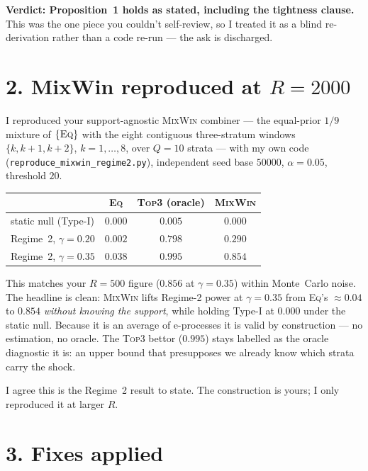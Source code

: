 \documentclass[11pt,a4paper]{article}
\begin{document}
\noindent \textbf{Verdict: Proposition~1 holds as stated, including the tightness
clause.} This was the one piece you couldn't self-review, so I treated it as a blind
re-derivation rather than a code re-run --- the ask is discharged.

\section*{2. MixWin reproduced at $R = 2000$}

I reproduced your support-agnostic \textsc{MixWin} combiner --- the equal-prior
$1/9$ mixture of $\{\textsc{Eq}\}$ with the eight contiguous three-stratum windows
$\{k, k{+}1, k{+}2\}$, $k = 1,\dots,8$, over $Q = 10$ strata --- with my own code
(\texttt{reproduce\_mixwin\_regime2.py}), independent seed base $50000$,
$\alpha = 0.05$, threshold $20$.

\medskip
\begin{center}
\begin{tabular}{lccc}
\toprule
 & \textsc{Eq} & \textsc{Top3} (oracle) & \textsc{MixWin} \\
\midrule
static null (Type-I)    & $0.000$ & $0.005$ & $0.000$ \\
Regime~2, $\gamma = 0.20$ & $0.002$ & $0.798$ & $0.290$ \\
Regime~2, $\gamma = 0.35$ & $0.038$ & $0.995$ & $0.854$ \\
\bottomrule
\end{tabular}
\end{center}
\medskip

\noindent This matches your $R = 500$ figure ($0.856$ at $\gamma = 0.35$) within
Monte~Carlo noise. The headline is clean: \textsc{MixWin} lifts Regime-2 power at
$\gamma = 0.35$ from \textsc{Eq}'s ${\approx}0.04$ to $0.854$ \emph{without knowing
the support}, while holding Type-I at $0.000$ under the static null. Because it is an
average of e-processes it is valid by construction --- no estimation, no oracle. The
\textsc{Top3} bettor ($0.995$) stays labelled as the oracle diagnostic it is: an
upper bound that presupposes we already know which strata carry the shock.

I agree this is the Regime~2 result to state. The construction is yours; I only
reproduced it at larger $R$.

\section*{3. Fixes applied}
\end{document}
